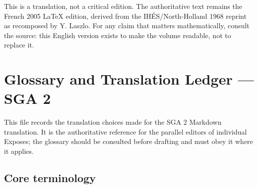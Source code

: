 \documentclass[
]{article}
\begin{document}
This is a translation, not a critical edition. The authoritative text
remains the French 2005 LaTeX edition, derived from the
IHÉS/North-Holland 1968 reprint as recomposed by Y. Laszlo. For any
claim that matters mathematically, consult the source: this English
version exists to make the volume readable, not to replace it.

\section{Glossary and Translation Ledger --- SGA
2}\label{glossary-and-translation-ledger-sga-2}

This file records the translation choices made for the SGA 2 Markdown
translation. It is the authoritative reference for the parallel
editors of individual Exposes; the glossary should be consulted
before drafting and must obey it where it applies.

\subsection{Core terminology}\label{core-terminology}
\end{document}
